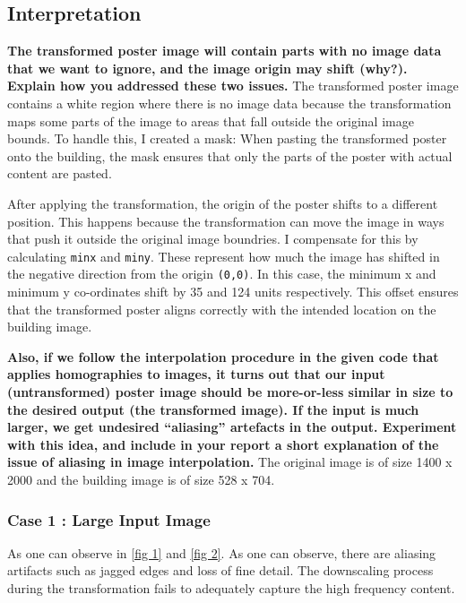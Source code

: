 \documentclass{article}
\begin{document}
\subsection{Interpretation}
\textbf{The transformed poster image will contain parts with no
image data that we want to ignore, and the image origin
may shift (why?). Explain how you addressed these two
issues.}
The transformed poster image contains a white region where there is no image data because the transformation maps some parts of the image
to areas that fall outside the original image bounds. To handle this, I created a mask: When pasting the transformed poster onto the building, 
the mask ensures that only the parts of the poster with actual content are pasted.

After applying the transformation, the origin of the poster shifts to a different position. This happens because the transformation can move the 
image in ways that push it outside the original image boundries. I compensate for this by calculating \texttt{minx} and \texttt{miny}. These
represent how much the image has shifted in the negative direction from the origin \texttt{(0,0)}. In this case, the minimum x and minimum y co-ordinates
shift by 35 and 124 units respectively. This offset ensures that the transformed poster aligns correctly with the intended location on the building image.

\textbf{Also, if we follow the interpolation procedure in the given code that applies homographies to images, it
turns out that our input (untransformed) poster image should be more-or-less similar in size to the desired
output (the transformed image). If the input is much larger, we get undesired “aliasing” artefacts in the
output. Experiment with this idea, and include in your report a short explanation of the issue of aliasing
in image interpolation.}
The original image is of size 1400 x 2000 and the building image is of size 528 x 704. 
\subsubsection{Case 1 : Large Input Image}
As one can observe in \ref{fig 1} and \ref{fig 2}. 
As one can observe, there are aliasing artifacts such as jagged edges and loss of fine detail. The downscaling process during the transformation 
fails to adequately capture the high frequency content. 
\end{document}
